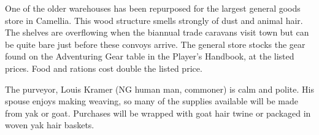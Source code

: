 One of the older warehouses has been repurposed for the largest general goods store in Camellia.
This wood structure smells strongly of dust and animal hair.
The shelves are overflowing when the biannual trade caravans visit town but can be quite bare just before these convoys arrive.
The general store stocks the gear found on the Adventuring Gear table in the Player's Handbook, at the listed prices. Food and rations cost double the listed price.

The purveyor, Louis Kramer (NG human man, commoner) is calm and polite.
His spouse enjoys making weaving, so many of the supplies available will be made from yak or goat.
Purchases will be wrapped with goat hair twine or packaged in woven yak hair baskets.
